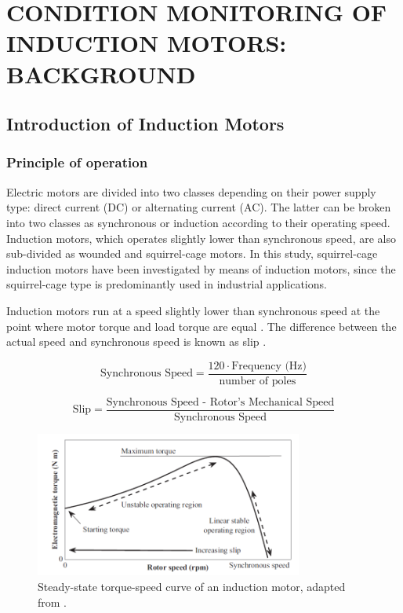 \chapter{CONDITION MONITORING OF INDUCTION MOTORS: BACKGROUND }\label{Ch2}
\vspace*{-12pt} %
\section{Introduction of Induction Motors}
\subsection{Principle of operation}

Electric motors are divided into two classes depending on their power supply type: direct current (DC) or alternating current (AC). The latter can be broken into two classes as synchronous or induction according to their operating speed. Induction motors, which operates slightly lower than synchronous speed, are also sub-divided as wounded and squirrel-cage motors. In this study, squirrel-cage induction motors have been investigated by means of induction motors, since the squirrel-cage type is predominantly used in industrial applications. 

Induction motors run at a speed slightly lower than synchronous speed at the point where motor torque and load torque are equal \cite{gunnar2016}. The difference between the actual speed and synchronous speed is known as slip \cite{doe2008improving}.

\begin{equation}
	\text{Synchronous Speed} = \displaystyle \frac{120 \cdot \text{Frequency (Hz)}}{\text{number of poles}}
	\label{speed}
\end{equation}

\begin{equation}
	\text{Slip} = \displaystyle \frac{\text{Synchronous Speed - Rotor's Mechanical Speed}}{\text{Synchronous Speed}}
	\label{slip}
\end{equation}

\begin{figure}[h]
	\centering
	\includegraphics[width=250pt,keepaspectratio=true]{./fig/torque_speed.PNG}
	\caption{Steady-state torque-speed curve of an induction motor, adapted from \cite{faiz2017fault}.}	
	\label{ts}
\end{figure}

